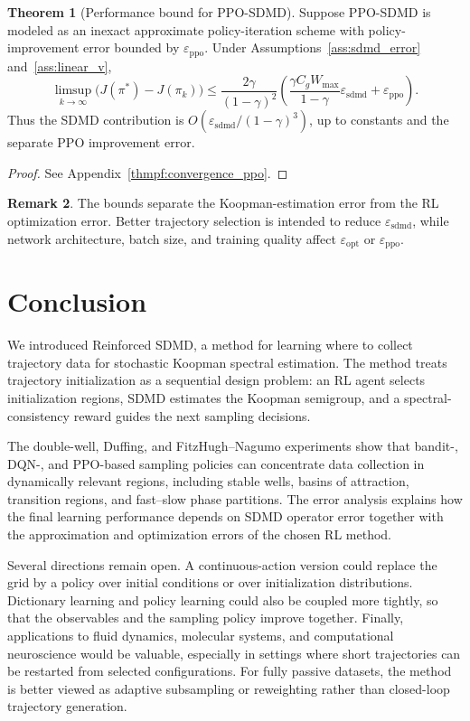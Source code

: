 \documentclass{article}
\numberwithin{equation}{section}
\theoremstyle{definition}
\newtheorem{theorem}{Theorem}[section]
\newtheorem{remark}[theorem]{Remark}
\begin{document}
\begin{theorem}[Performance bound for PPO-SDMD]\label{thm:convergence_ppo}
Suppose PPO-SDMD is modeled as an inexact approximate policy-iteration scheme with policy-improvement error bounded by $\varepsilon_{\mathrm{ppo}}$. Under Assumptions~\ref{ass:sdmd_error} and~\ref{ass:linear_v},
\begin{equation}\label{eq:ppo_error_bound}
\limsup_{k\to\infty}\bigl(J(\pi^*)-J(\pi_k)\bigr)
\le
\frac{2\gamma}{(1-\gamma)^2}
\left(
\frac{\gamma C_g W_{\max}}{1-\gamma}\varepsilon_{\mathrm{sdmd}}
+\varepsilon_{\mathrm{ppo}}
\right).
\end{equation}
Thus the SDMD contribution is $O(\varepsilon_{\mathrm{sdmd}}/(1-\gamma)^3)$, up to constants and the separate PPO improvement error.
\end{theorem}
\begin{proof} See Appendix~\ref{thmpf:convergence_ppo}. \end{proof}

\begin{remark}
The bounds separate the Koopman-estimation error from the RL optimization error. Better trajectory selection is intended to reduce $\varepsilon_{\mathrm{sdmd}}$, while network architecture, batch size, and training quality affect $\varepsilon_{\mathrm{opt}}$ or $\varepsilon_{\mathrm{ppo}}$.
\end{remark}

\section{Conclusion}
We introduced Reinforced SDMD, a method for learning where to collect trajectory data for stochastic Koopman spectral estimation. The method treats trajectory initialization as a sequential design problem: an RL agent selects initialization regions, SDMD estimates the Koopman semigroup, and a spectral-consistency reward guides the next sampling decisions.

The double-well, Duffing, and FitzHugh--Nagumo experiments show that bandit-, DQN-, and PPO-based sampling policies can concentrate data collection in dynamically relevant regions, including stable wells, basins of attraction, transition regions, and fast--slow phase partitions. The error analysis explains how the final learning performance depends on SDMD operator error together with the approximation and optimization errors of the chosen RL method.

Several directions remain open. A continuous-action version could replace the grid by a policy over initial conditions or over initialization distributions. Dictionary learning and policy learning could also be coupled more tightly, so that the observables and the sampling policy improve together. Finally, applications to fluid dynamics, molecular systems, and computational neuroscience would be valuable, especially in settings where short trajectories can be restarted from selected configurations. For fully passive datasets, the method is better viewed as adaptive subsampling or reweighting rather than closed-loop trajectory generation.
\end{document}
